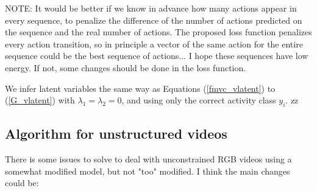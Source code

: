 \documentclass[10pt,letterpaper]{article}
\newcommand{\+}[1]{\ensuremath{{\boldsymbol #1}}}
\begin{document}
NOTE: It would be better if we know in advance how many actions appear in every sequence, to penalize the difference of the number of actions predicted on the sequence and the real number of actions. The proposed loss function penalizes every action transition, so in principle a vector of the same action for the entire sequence could be the best sequence of actions... I hope these sequences have low energy. If not, some changes should be done in the loss function. 

We infer latent variables the same way as Equations (\ref{fmvc_vlatent}) to (\ref{G_vlatent}) with $\lambda_1
 = \lambda_{2} = 0$, and using only the correct activity class $y_i$.
zz
\subsection{Algorithm for unstructured videos}
There is some issues to solve to deal with unconstrained RGB videos using a somewhat modified model, but not "too" modified. I think the main changes could be:
\end{document}
